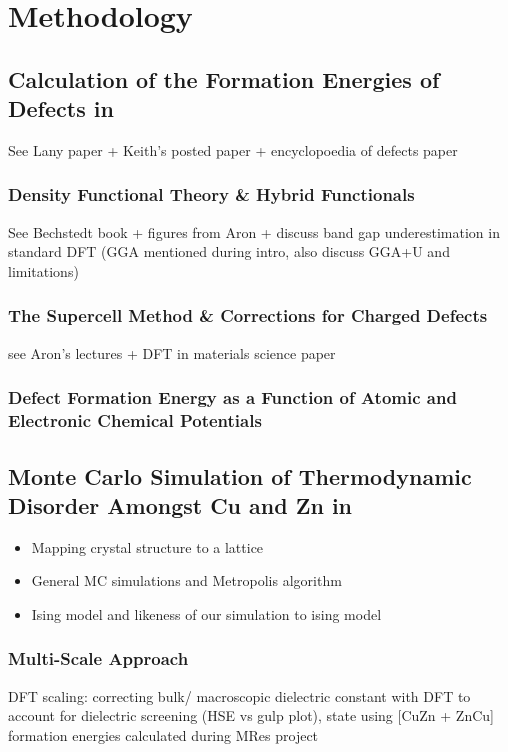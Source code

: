 \chapter{Methodology}

\section{Calculation of the Formation Energies of Defects in \CZTS}
See Lany paper + Keith's posted paper + encyclopoedia of defects paper 


\subsection{Density Functional Theory \& Hybrid Functionals}\label{DFT_section}
See Bechstedt book \cite{Bechstedt} + figures from Aron + discuss band gap underestimation in standard DFT (GGA mentioned during intro, also discuss GGA+U and limitations)


\subsection{The Supercell Method \& Corrections for Charged Defects}\label{supercell_section}
see Aron's lectures + DFT in materials science paper \cite{DFT_in_mat}

\subsection{Defect Formation Energy as a Function of Atomic and Electronic Chemical Potentials}


\section{Monte Carlo Simulation of Thermodynamic Disorder Amongst Cu and Zn in \CZTS}
\begin{itemize}
\item Mapping crystal structure to a lattice
\item General MC simulations and Metropolis algorithm
\item Ising model and likeness of our simulation to ising model
\end{itemize}

\subsection{Multi-Scale Approach}
DFT scaling: correcting bulk/ macroscopic dielectric constant with DFT to account for dielectric screening (HSE vs gulp plot), state using [CuZn + ZnCu] formation energies calculated during MRes project

